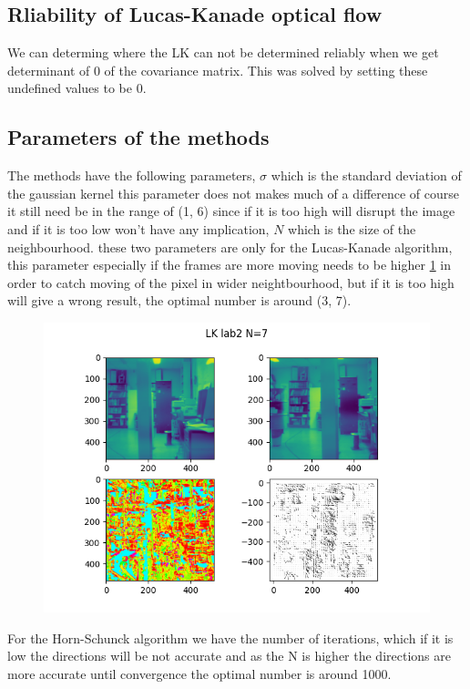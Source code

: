 \documentclass[9pt]{IEEEtran}
\begin{document}
\subsection{Rliability of Lucas-Kanade optical flow}
We can determing where the LK can not be determined reliably when we get determinant of 0 of the covariance matrix. This was solved by setting these undefined values to be 0.
\subsection{Parameters of the methods}
The methods have the following parameters, $\sigma$ which is the standard deviation of the gaussian kernel this parameter does not makes much of a difference of course it still need be in the range of (1, 6) since if it is too high will disrupt the image and if it is too low won't have any implication, $N$ which is the size of the neighbourhood. these two parameters are only for the Lucas-Kanade algorithm, this parameter especially if the frames are more moving needs to be higher \ref{fig:lab2lk7} in order to catch moving of the pixel in wider neightbourhood, but if it is too high will give a wrong result, the optimal number is around (3, 7).
\begin{figure}[h]
    \centering
    \includegraphics[width=1\columnwidth, scale=0.5]{lab2lk7.png}
    \label{fig:lab2lk7}
\end{figure}
For the Horn-Schunck algorithm we have the number of iterations, which if it is low the directions will be not accurate and as the N is higher the directions are more accurate until convergence the optimal number is around 1000.
\end{document}
